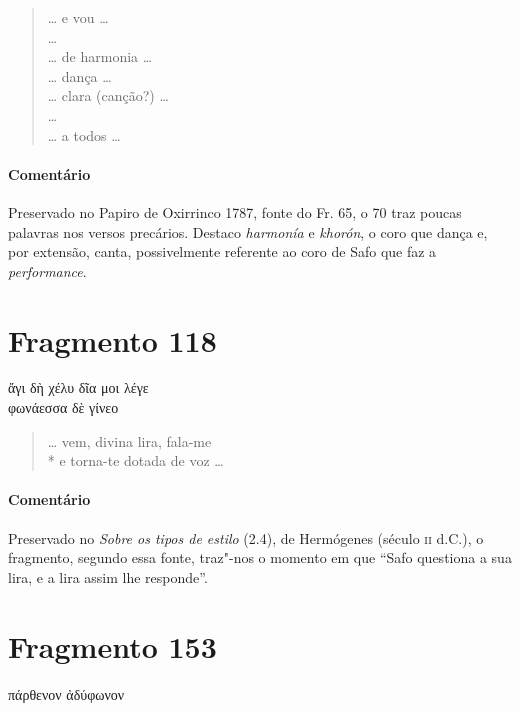 {\begin{gkverse}
\end{gkverse}

\begin{verse}
\ldots{} e vou \ldots{}\\
\ldots{}\\
\ldots{} de harmonia \ldots{}\\
\ldots{} dança \ldots{}\\
\ldots{} clara (canção?) \ldots{}\\
\ldots{}\\
\ldots{} a todos \ldots{} 
\end{verse}


{\paragraph{Comentário} Preservado no Papiro de Oxirrinco 1787, fonte do Fr. 65, o 70 traz poucas palavras nos versos precários. Destaco \textit{harmonía} e \textit{khorón}, o coro que dança e, por extensão, canta, possivelmente referente ao coro de Safo que faz a \textit{performance}.}

\pagebreak
\section{Fragmento 118}

\begin{gkverse}
ἄγι δὴ χέλυ δῖα \dagger{}μοι λέγε\dagger{}\\
φωνάεσσα \dagger{}δὲ γίνεο\dagger{}
\end{gkverse}

\begin{verse}
\ldots{} vem, divina lira, fala-me\\*
e torna-te dotada de voz \ldots{}
\end{verse}

{\paragraph{Comentário} Preservado no \textit{Sobre os tipos de estilo} (2.4), de Hermógenes (século \textsc{ii} d.C.),
o fragmento, segundo essa fonte, traz"-nos o momento em que ``Safo
questiona a sua lira, e a lira assim lhe responde”.}


\section{Fragmento 153}

\begin{gkverse}
πάρθενον ἀδύφωνον
\end{gkverse}

}

